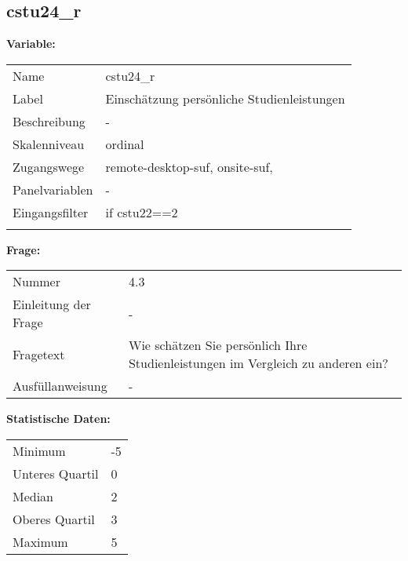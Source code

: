 	
	
	\subsection{cstu24\_r}
	\label{subSection:cstu24_r}

	\noindent\textbf{Variable:}\\
		\begin{tabular}{lL{11.3cm}}
			\label{tableVariable:cstu24_r}
			Name & cstu24\_r \\
			Label & Einschätzung persönliche Studienleistungen \\
			Beschreibung & - \\
			Skalenniveau & ordinal \\
			Zugangswege &
				remote-desktop-suf,
				onsite-suf,
 \\
			Panelvariablen & -
			 \\
			Eingangsfilter & if cstu22==2 \\
 \\
		\end{tabular}

		\vspace*{1 cm}
		\noindent\textbf{Frage:}\\
		\begin{tabular}{lL{11.3cm}}
			\label{tableQuestion:cstu24_r}
			Nummer & 4.3 \\
			Einleitung der Frage & - \\
			Fragetext & Wie schätzen Sie persönlich Ihre Studienleistungen im Vergleich zu anderen ein? \\
			Ausfüllanweisung & - \\
		\end{tabular}


		\vspace*{1 cm}
		\noindent\textbf{Statistische Daten:}\\
			\begin{tabular}{ll}
				\label{tableStatistics:cstu24_r}
					Minimum & -5 \\
					Unteres Quartil & 0 \\
					Median & 2 \\
					Oberes Quartil & 3 \\
					Maximum & 5 \\
			\end{tabular}



